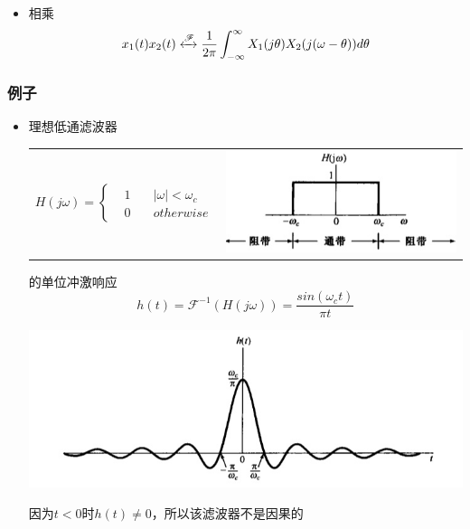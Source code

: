 \documentclass[CJKutf8,xcolor=pdftex,dvipsnames,table]{beamer}
\begin{document}
\begin{CJK*}{UTF8}{song}
\begin{frame}
\begin{itemize}
    \item 相乘
    \[
    	x_1(t)x_2(t) \xleftrightarrow{\mathscr{F}} \frac{1}{2\pi} \int_{-\infty}^{\infty}X_1(j\theta)X_2(j(\omega-\theta))d\theta
    \]    	
    \end{itemize}
  \end{frame}   
  	
  \begin{frame}
    \frametitle{例子}
    \begin{itemize}
    \item 理想低通滤波器 \\
	\begin{tabular}{ll}
	\raisebox{-.5\height}

    \begin{math}
H(j\omega) = 
\left\{
    \begin {aligned}
         & 1 \quad & |\omega| < \omega_c \\
         & 0 \quad & otherwise                  
    \end{aligned}
\right.
	\end{math}

&
    \includegraphics[valign=m,scale=.35]{ss-c-f4-20}    \\
    \end{tabular}      
    
    的单位冲激响应
    \[
    h(t)=\mathscr{F}^{-1}(H(j\omega))=\frac{sin(\omega_c t)}{\pi t}
    \]
    \begin{center}
      \includegraphics[scale=.4]{ss-c-f4-21}
    \end{center}
    因为$t<0$时$h(t)\neq 0$，所以该滤波器不是因果的
    

\end{itemize}
\end{frame}
\end{CJK*}
\end{document}
